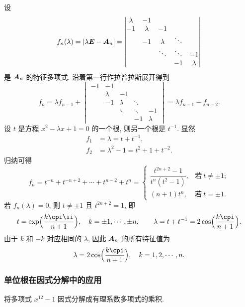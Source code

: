 \begin{solution}
  设
  \[
     f_n(\lambda)
    =|\lambda{\boldsymbol{E}}-{\boldsymbol{A}}_n|
    =\begin{vmatrix}
      \lambda&-1&&&\\
      -1&\lambda&-1&&\\
      &-1&\lambda&\ddots&\\
      &&\ddots&\ddots &-1\\
      &&&-1&\lambda
    \end{vmatrix}
  \]
  是 ${\boldsymbol{A}}_n$ 的特征多项式.
  沿着第一行作拉普拉斯展开得到
  \[
    f_n=\lambda f_{n-1}+\begin{vmatrix}
      -1&-1&&&\\
      &\lambda&-1&&\\
      &-1&\lambda&\ddots&\\
      &&\ddots&\ddots&-1\\
      &&&-1&\lambda
    \end{vmatrix}
    =\lambda f_{n-1}-f_{n-2}.
  \]
  设 $t$ 是方程 $x^2-\lambda x+1=0$ 的一个根, 则另一个根是 $t^{-1}$.
  显然
  \begin{align*}
    f_1&=\lambda=t+t^{-1},\\
    f_2&=\lambda^2-1=t^2+1+t^{-2}.
  \end{align*}
  归纳可得
  \[
     f_n
    =t^{-n}+t^{-n+2}+\cdots+t^{n-2}+t^n
    =\begin{cases}
      \dfrac{t^{2n+2}-1}{t^n(t^2-1)},&\text{若}\ t\neq \pm1;\\
      (n+1)t^n,&\text{若}\ t=\pm1.
    \end{cases}
  \]
  若 $f_n(\lambda)=0$, 则 $t\neq \pm1$ 且 $t^{2n+2}=1$, 即
  \[
    t=\exp\Bigl(\frac{k\cpi\ii}{n+1}\Bigr),\quad
    k=\pm 1,\cdots,\pm n,\qquad
    \lambda=t+t^{-1}=2\cos\Bigl(\frac{k\cpi}{n+1}\Bigr).
  \]
  由于 $k$ 和 $-k$ 对应相同的 $\lambda$, 因此 ${\boldsymbol{A}}_n$ 的所有特征值为
  \[
    \lambda=2\cos\Bigl(\frac{k\cpi}{n+1}\Bigr),
    \quad k=1,2,\cdots,n.
  \]
\end{solution}



\subsubsection{单位根在因式分解中的应用}

\begin{example}
  将多项式 $x^{12}-1$ 因式分解成有理系数多项式的乘积.
\end{example}

